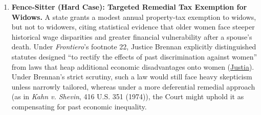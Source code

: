 \documentclass[12pt]{article}
\begin{document}
\begin{enumerate}
    \item \textbf{Fence-Sitter (Hard Case): Targeted Remedial Tax Exemption for Widows.} A state grants a modest annual property-tax exemption to widows, but not to widowers, citing statistical evidence that older women face steeper historical wage disparities and greater financial vulnerability after a spouse's death. Under \textit{Frontiero}'s footnote 22, Justice Brennan explicitly distinguished statutes designed ``to rectify the effects of past discrimination against women'' from laws that heap additional economic disadvantages onto women (\href{https://supreme.justia.com/cases/federal/us/411/677/}{Justia}). Under Brennan's strict scrutiny, such a law would still face heavy skepticism unless narrowly tailored, whereas under a more deferential remedial approach (as in \textit{Kahn v. Shevin}, 416 U.S. 351 (1974)), the Court might uphold it as compensating for past economic inequality.
\end{enumerate}
\end{document}
